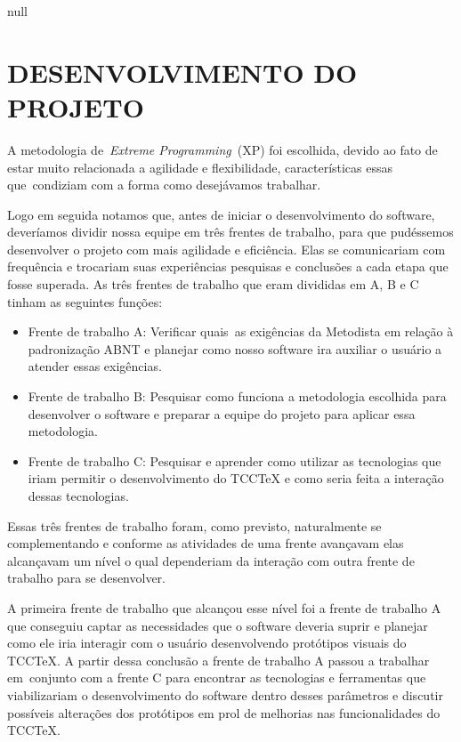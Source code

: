 null
\chapter{DESENVOLVIMENTO DO PROJETO}

\bigskip


A metodologia de\ \textit{Extreme Programming}\ (XP) foi escolhida, devido ao fato de estar muito relacionada a
agilidade e flexibilidade, caracter\'isticas essas que\ condiziam com a forma como desej\'avamos trabalhar.

Logo em seguida notamos que, antes de iniciar o desenvolvimento do software, dever\'iamos dividir nossa equipe em tr\^es
frentes de trabalho, para que pud\'essemos desenvolver o projeto com mais agilidade e efici\^encia. Elas se
comunicariam com frequ\^encia e trocariam suas experi\^encias pesquisas e conclus\~oes a cada etapa que fosse superada.
As tr\^es frentes de trabalho que eram divididas em A, B e C tinham as seguintes fun\c{c}\~oes:


\bigskip

\liststyleLFOi
\begin{itemize}
\item {
Frente de trabalho A: Verificar quais\ as exig\^encias da Metodista em rela\c{c}\~ao \`a padroniza\c{c}\~ao ABNT e
planejar como nosso software ira auxiliar o usu\'ario a atender essas exig\^encias.}
\item {
\textrm{Frente de trabalho B: Pesquisar como funciona a metodologia escolhida para desenvolver o software e preparar a
equipe do projeto para aplicar essa metodologia.}}
\item {
\textrm{Frente de trabalho C: Pesquisar e aprender como utilizar as tecnologias que iriam permitir o desenvolvimento do
TCCTeX e como seria feita a intera\c{c}\~ao dessas tecnologias.\ }}
\end{itemize}

\bigskip

Essas tr\^es frentes de trabalho foram, como previsto, naturalmente se complementando e conforme as atividades de uma
frente avan\c{c}avam elas alcan\c{c}avam um n\'ivel o qual dependeriam da intera\c{c}\~ao com outra frente de trabalho
para se desenvolver.\ 

A primeira frente de trabalho que alcan\c{c}ou esse n\'ivel foi a frente de trabalho A que conseguiu captar as
necessidades que o software deveria suprir e planejar como ele iria interagir com o usu\'ario desenvolvendo
prot\'otipos visuais do TCCTeX. A partir dessa conclus\~ao a frente de trabalho A passou a trabalhar em\ conjunto com a
frente C para encontrar as tecnologias e ferramentas que viabilizariam o desenvolvimento do software dentro desses
par\^ametros e discutir poss\'iveis altera\c{c}\~oes dos prot\'otipos em prol de melhorias nas funcionalidades do
TCCTeX.

